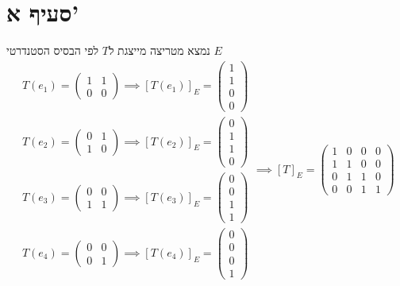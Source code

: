 \documentclass[12pt, titlepage]{article}
\begin{document}
\section*{סעיף א'}
נמצא מטריצה מייצגת ל$T$ לפי הבסיס הסטנדרטי $E$
\[
\begin{gathered}
    T\left(e_1\right) = \begin{pmatrix}1&1\\0&0\end{pmatrix}\implies\left[T\left(e_1\right)\right]_E=\begin{pmatrix}1\\1\\0\\0\end{pmatrix}\\
    T\left(e_2\right) = \begin{pmatrix}0&1\\1&0\end{pmatrix}\implies\left[T\left(e_2\right)\right]_E=\begin{pmatrix}0\\1\\1\\0\end{pmatrix}\\
    T\left(e_3\right) = \begin{pmatrix}0&0\\1&1\end{pmatrix}\implies\left[T\left(e_3\right)\right]_E=\begin{pmatrix}0\\0\\1\\1\end{pmatrix}\\
    T\left(e_4\right) = \begin{pmatrix}0&0\\0&1\end{pmatrix}\implies\left[T\left(e_4\right)\right]_E=\begin{pmatrix}0\\0\\0\\1\end{pmatrix}
\end{gathered}\implies \left[T\right]_E = \begin{pmatrix}
    1 & 0 & 0 & 0\\
    1 & 1 & 0 & 0 \\
    0 & 1 & 1 & 0 \\
    0 & 0 & 1 & 1
\end{pmatrix}
\]
\end{document}
